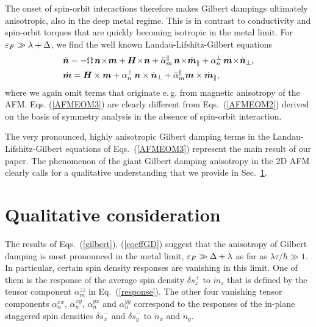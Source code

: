 
The onset of spin-orbit interactions therefore makes Gilbert dampings ultimately anisotropic, also in the deep metal regime. This is in contrast to conductivity and spin-orbit torques that are quickly becoming isotropic in the metal limit. 
For $\varepsilon_F\gg \lambda+\Delta$, we find the well known Landau-Lifshitz-Gilbert equations
\begin{align}
&\dot{\bb{n}} = -\Omega\, \bb{n}\!\times\!\bb{m} +\bb{H}\!\times\!\bb{n}+\bar{\alpha}^\parallel_m\,\bb{n}\!\times\!\dot{\bb{m}}_\parallel+\alpha_n^\perp\,\bb{m}\!\times\! \dot{\bb{n}}_\perp,\n\\
&\dot{\bb{m}} =\bb{H}\times\bb{m}+\alpha_n^\perp\,\bb{n} \times \dot{\bb{n}}_\perp
+\bar{\alpha}_m^\parallel \bb{m} \times \dot{\bb{m}}_\parallel,
\label{AFMEOM3}
\end{align}
where we again omit terms that originate e.\,g. from magnetic anisotropy of the AFM. 
Eqs. (\ref{AFMEOM3}) are clearly different from Eqs.~(\ref{AFMEOM2}) derived on the basis of symmetry analysis in the absence of spin-orbit interaction. 

The very pronounced, highly anisotropic Gilbert damping terms in the Landau-Lifshitz-Gilbert equations of Eqs.~(\ref{AFMEOM3}) represent the main result of our paper. The phenomenon of the giant Gilbert damping anisotropy in the 2D AFM clearly calls for a qualitative understanding that we provide in Sec.~\ref{sec:qual}.

\section{Qualitative consideration}\label{sec:qual}

The results of Eqs.~(\ref{gilbert}), (\ref{coeffGD}) suggest that the anisotropy of Gilbert damping is most pronounced in the metal limit, $\varepsilon_F\gg \Delta+\lambda$ as far as $\lambda \tau/\hbar \gg 1$. In particular, certain spin density responses are vanishing in this limit. One of them is the response of the average spin density $\delta s_z^+$ to $\dot{m}_z$ that is defined by the tensor component $\alpha^{zz}_m$ in Eq.~(\ref{response}). The other four vanishing tensor components $\alpha^{xx}_n$, $\alpha^{xy}_n$, $\alpha^{yx}_n$ and $\alpha^{yy}_n$ correspond to the responses of the in-plane staggered spin densities $\delta s_{x}^-$ and $\delta s_{y}^-$ to $\dot{n}_x$ and $\dot{n}_y$.  

